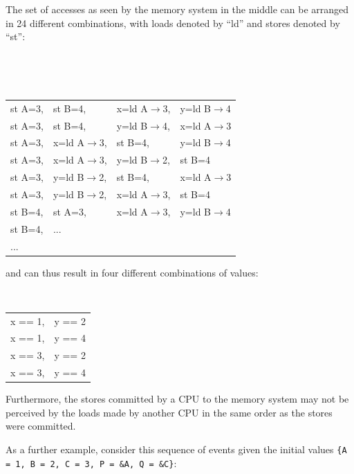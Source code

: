The set of accesses as seen by the memory system in the middle can be arranged
in 24 different combinations, with loads denoted by ``ld'' and stores
denoted by ``st'':

~ \\
\begin{minipage}[t]{\columnwidth}
\tt
\scriptsize
\begin{tabular}{llll}
	st A=3, & st B=4, & x=ld A$\rightarrow$3, & y=ld B$\rightarrow$4 \\
	st A=3, & st B=4, & y=ld B$\rightarrow$4, & x=ld A$\rightarrow$3 \\
	st A=3, & x=ld A$\rightarrow$3, & st B=4, & y=ld B$\rightarrow$4 \\
	st A=3, & x=ld A$\rightarrow$3, & y=ld B$\rightarrow$2, & st B=4 \\
	st A=3, & y=ld B$\rightarrow$2, & st B=4, & x=ld A$\rightarrow$3 \\
	st A=3, & y=ld B$\rightarrow$2, & x=ld A$\rightarrow$3, & st B=4 \\
	st B=4, & st A=3, & x=ld A$\rightarrow$3, & y=ld B$\rightarrow$4 \\
	st B=4, & ... & & \\
	... & & & \\
\end{tabular}
\end{minipage}
\vspace{5pt}

and can thus result in four different combinations of values:

\vspace{5pt}
\begin{minipage}[t]{\columnwidth}
\tt
\scriptsize
\begin{tabular}{ll}
	x == 1, & y == 2 \\
	x == 1, & y == 4 \\
	x == 3, & y == 2 \\
	x == 3, & y == 4 \\
\end{tabular}
\end{minipage}
\vspace{5pt}

Furthermore, the stores committed by a CPU to the memory system may not be
perceived by the loads made by another CPU in the same order as the stores were
committed.

As a further example, consider this sequence of events given the
initial values {\tt \{A = 1, B = 2, C = 3, P = \&A, Q = \&C\}}:

